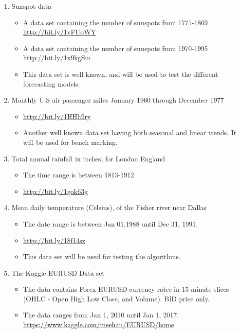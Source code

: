 \documentclass[10pt,a4paper]{article}
\begin{document}
\begin{enumerate}
   \item Sunspot data
   \begin{itemize}
   \item A data set containing the number of sunspots from 1771-1869\\ \url{http://bit.ly/1yFUqWY}
   \item A data set containing the number of sunspots from 1970-1995\\ \url{http://bit.ly/1x9kgSm}
   \item This data set is well known, and will be used to test the different forecasting models.
   \end{itemize}
   \item Monthly U.S air passenger miles January 1960 through December 1977
   \begin{itemize}
   \item \url{http://bit.ly/1HHh9ry}
   \item Another well known data set having both seasonal and linear trends. It will be used for bench marking.
   \end{itemize}   
    \item Total annual rainfall in inches, for London England
   \begin{itemize}
   \item The time range is between 1813-1912
   \item \url{http://bit.ly/1gok63g}
   \end{itemize}       
   \item Mean daily temperature (Celsius), of the Fisher river near Dallas
   \begin{itemize}
   \item The date range is between Jan 01,1988 until Dec 31, 1991.
   \item \url{http://bit.ly/18f14sz}
   \item This data set will be used for testing the algorithms.
   \end{itemize}
      \item The Kaggle EURUSD Data set
   \begin{itemize}
     \item The data contains Forex EURUSD currency rates in 15-minute slices (OHLC - Open High Low Close, and Volume).  BID price only.
     \item The data ranges from Jan 1, 2010 until Jan 1, 2017.\\
     \url{https://www.kaggle.com/meehau/EURUSD/home}
   \end{itemize}
   

\end{enumerate}
\end{document}
